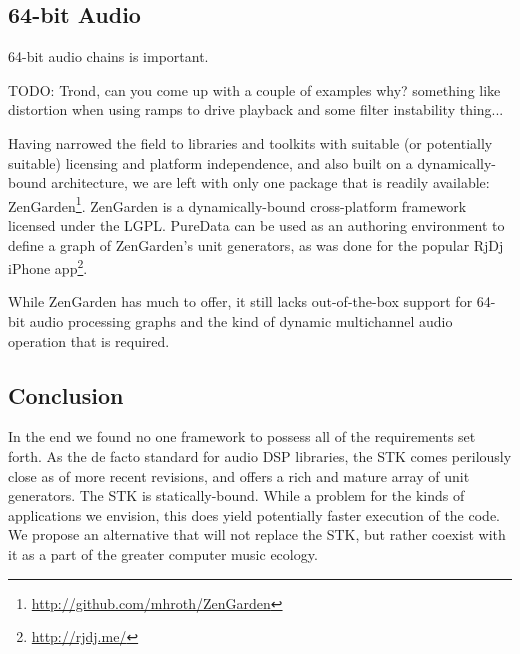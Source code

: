 \documentclass[twoside,10pt]{article}
\begin{document}


\subsection{64-bit Audio} %

64-bit audio chains is important.

TODO: Trond, can you come up with a couple of examples why?  something like distortion when using ramps to drive playback and some filter instability thing...

Having narrowed the field to libraries and toolkits with suitable (or potentially suitable) licensing and platform independence, and also built on a dynamically-bound architecture, we are left with only one package that is readily available: ZenGarden\footnote{\url{http://github.com/mhroth/ZenGarden}}.  ZenGarden is a dynamically-bound cross-platform framework licensed under the LGPL.  PureData can be used as an authoring environment to define a graph of ZenGarden's unit generators, as was done for the popular RjDj iPhone app\footnote{\url{http://rjdj.me/}}.

While ZenGarden has much to offer, it still lacks out-of-the-box support for 64-bit audio processing graphs and the kind of dynamic multichannel audio operation that is required.



\subsection{Conclusion} %

In the end we found no one framework to possess all of the requirements set forth.  As the de facto standard for audio DSP libraries, the STK comes perilously close as of more recent revisions\cite{Scavone:2005}, and offers a rich and mature array of unit generators.  The STK is statically-bound.  While a problem for the kinds of applications we envision, this does yield potentially faster execution of the code.  We propose an alternative that will not replace the STK, but rather coexist with it as a part of the greater computer music ecology.


%
\end{document}
